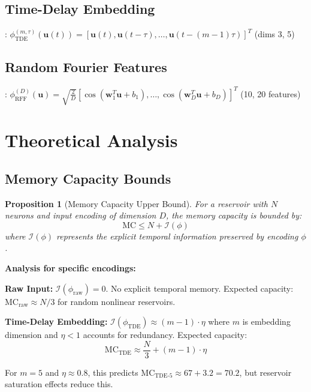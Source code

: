 \documentclass[11pt]{article}
\newtheorem{proposition}{Proposition}
\begin{document}
\subsection{Time-Delay Embedding}: 
$\phi_{\text{TDE}}^{(m,\tau)}(\mathbf{u}(t)) = [\mathbf{u}(t), \mathbf{u}(t-\tau), \ldots, \mathbf{u}(t-(m-1)\tau)]^T$ (dims 3, 5)

\subsection{Random Fourier Features}:
$\phi_{\text{RFF}}^{(D)}(\mathbf{u}) = \sqrt{\frac{2}{D}} [\cos(\mathbf{w}_1^T\mathbf{u} + b_1), \ldots, \cos(\mathbf{w}_D^T\mathbf{u} + b_D)]^T$ (10, 20 features)

\section{Theoretical Analysis}

\subsection{Memory Capacity Bounds}

\begin{proposition}[Memory Capacity Upper Bound]
For a reservoir with $N$ neurons and input encoding of dimension $D$, the memory capacity is bounded by:
\begin{equation}
\text{MC} \leq N + \mathcal{I}(\phi)
\end{equation}
where $\mathcal{I}(\phi)$ represents the explicit temporal information preserved by encoding $\phi$.
\end{proposition}

\textbf{Analysis for specific encodings:}

\textbf{Raw Input:} $\mathcal{I}(\phi_{\text{raw}}) = 0$. No explicit temporal memory. Expected capacity: $\text{MC}_{\text{raw}} \approx N/3$ for random nonlinear reservoirs.

\textbf{Time-Delay Embedding:} $\mathcal{I}(\phi_{\text{TDE}}) \approx (m-1) \cdot \eta$ where $m$ is embedding dimension and $\eta < 1$ accounts for redundancy. Expected capacity:
\begin{equation}
\text{MC}_{\text{TDE}} \approx \frac{N}{3} + (m-1) \cdot \eta
\end{equation}

For $m=5$ and $\eta \approx 0.8$, this predicts $\text{MC}_{\text{TDE-5}} \approx 67 + 3.2 = 70.2$, but reservoir saturation effects reduce this.
\end{document}
